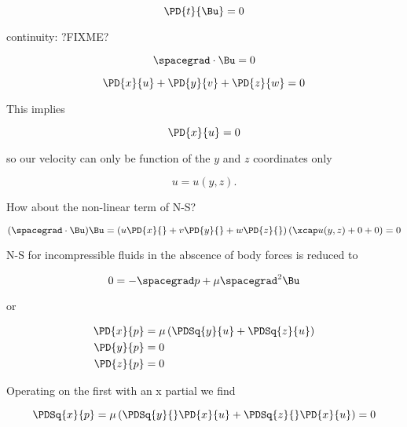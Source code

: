 \begin{equation}\label{eqn:continuumL11:210}
\PD{t}{\Bu} = 0
\end{equation}

continuity: ?FIXME?

\begin{equation}\label{eqn:continuumL11:230}
\spacegrad \cdot \Bu = 0
\end{equation}

\begin{equation}\label{eqn:continuumL11:250}
\PD{x}{u} + \PD{y}{v} + \PD{z}{w} = 0
\end{equation}

This implies 

\begin{equation}\label{eqn:continuumL11:270}
\PD{x}{u} = 0
\end{equation}

so our velocity can only be function of the $y$ and $z$ coordinates only

\begin{equation}\label{eqn:continuumL11:290}
u = u(y, z).
\end{equation}

How about the non-linear term of N-S?

\begin{equation}\label{eqn:continuumL11:510}
(\spacegrad \cdot \Bu) \Bu
=
\left(u \PD{x}{}
+v \PD{y}{}
+w \PD{z}{} \right) (\xcap u( y, z) + 0 + 0 )
= 0
\end{equation}

N-S for incompressible fluids in the abscence of body forces is reduced to

\begin{equation}\label{eqn:continuumL11:310}
0 = - \spacegrad p + \mu \spacegrad^2 \Bu 
\end{equation}

or

\begin{align}\label{eqn:continuumL11:330}
\PD{x}{p} &= \mu \left( \PDSq{y}{u} + \PDSq{z}{u} \right) \\
\PD{y}{p} &= 0 \\
\PD{z}{p} &= 0 
\end{align}

Operating on the first with an x partial we find

\begin{equation}\label{eqn:continuumL11:350}
\PDSq{x}{p} = \mu \left( \PDSq{y}{} \PD{x}{u} + \PDSq{z}{}\PD{x}{u} \right) = 0
\end{equation}

